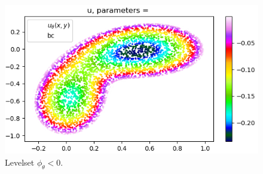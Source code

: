 \documentclass[french]{article}
\begin{document}
	\begin{minipage}{0.33\linewidth}
		\begin{figure}[H]
			\centering
			\includegraphics[width=\linewidth]{"levelset/bean/sol_mask_bean.png"}
			\caption{Levelset $\phi_\theta<0$.}
		\end{figure}
	\end{minipage}
	
\end{document}
